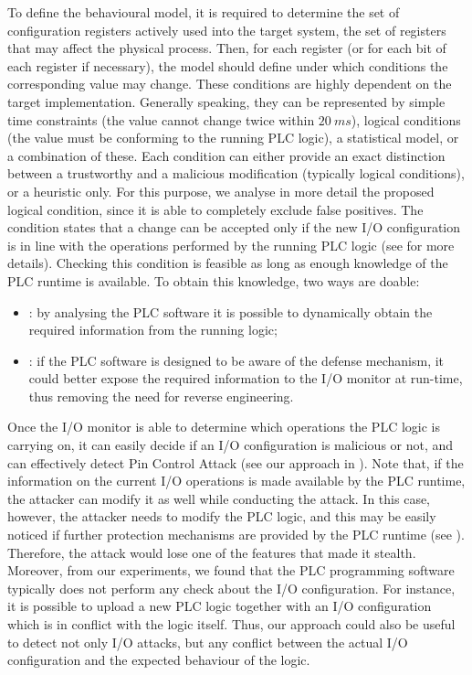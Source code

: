 To define the behavioural model, it is required to determine the set of configuration registers actively used into the target system,
\ie the set of registers that may affect the physical process. Then, for each register (or for each bit of each register if necessary),
the model should define under which conditions the corresponding value may change. These conditions are highly dependent on the target implementation.
Generally speaking, they can be represented by simple time constraints (\eg the value cannot change twice within $\SI{20}{ms}$),
logical conditions (\eg the value must be conforming to the running PLC logic), a statistical model, or a combination of these.
Each condition can either provide an exact distinction between a trustworthy and a malicious modification (typically logical conditions),
or a heuristic only. For this purpose, we analyse in more detail the proposed logical condition, since it is able to completely exclude false positives.
The condition states that a change can be accepted only if the new I/O configuration is in line with the operations performed by the running PLC logic
(see  for more details).
Checking this condition is feasible as long as enough knowledge of the PLC runtime is available. To obtain this knowledge, two ways are doable:
\begin{itemize}
	\item {}: by analysing the PLC software it is possible to dynamically obtain the required information from the running logic;
	\item {}: if the PLC software is designed to be aware of the defense mechanism,
		it could better expose the required information to the I/O monitor at run-time, thus removing the need for reverse engineering.
\end{itemize}
Once the I/O monitor is able to determine which operations the PLC logic is carrying on, it can easily decide if an I/O configuration is malicious or not,
and can effectively detect Pin Control Attack (see our approach in ).
Note that, if the information on the current I/O operations is made available by the PLC runtime, the attacker can modify it as well while conducting the attack.
In this case, however, the attacker needs to modify the PLC logic, and this may be easily noticed if further protection mechanisms are provided by the PLC runtime
(see ). Therefore, the attack would lose one of the features that made it stealth.
Moreover, from our experiments, we found that the PLC programming software typically does not perform any check about the I/O configuration.
For instance, it is possible to upload a new PLC logic together with an I/O configuration which is in conflict with the logic itself.
Thus, our approach could also be useful to detect not only I/O attacks, but any conflict between the actual I/O configuration and the expected behaviour of the logic.

